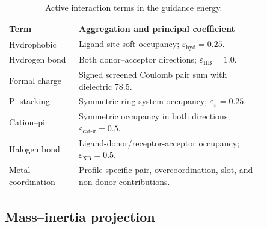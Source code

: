 \documentclass{article}
\begin{document}
\begin{table}[htbp]
    \centering
    \small
    \caption{Active interaction terms in the guidance energy.}
    \label{tab:si_interaction_terms}
    \begin{tabular}{p{0.23\linewidth}p{0.62\linewidth}}
        \toprule
        Term & Aggregation and principal coefficient \\
        \midrule
        Hydrophobic & Ligand-site soft occupancy; \(\varepsilon_{\mathrm{hyd}}=0.25\). \\
        Hydrogen bond & Both donor--acceptor directions; \(\varepsilon_{\mathrm{HB}}=1.0\). \\
        Formal charge & Signed screened Coulomb pair sum with dielectric 78.5. \\
        Pi stacking & Symmetric ring-system occupancy; \(\varepsilon_{\pi}=0.25\). \\
        Cation--pi & Symmetric occupancy in both directions; \(\varepsilon_{\mathrm{cat}\text{-}\pi}=0.5\). \\
        Halogen bond & Ligand-donor/receptor-acceptor occupancy; \(\varepsilon_{\mathrm{XB}}=0.5\). \\
        Metal coordination & Profile-specific pair, overcoordination, slot, and non-donor contributions. \\
        \bottomrule
    \end{tabular}
\end{table}

\subsection{Mass--inertia projection}
\label{si:guidance_projection}
\end{document}
